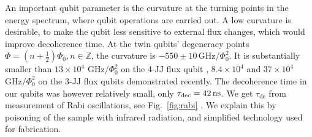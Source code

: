  An  important  qubit parameter  is  the  curvature at  the
 turning  points  in  the   energy  spectrum,  where  qubit
 operations are carried out.  A low curvature is desirable,
 to make the qubit less sensitive to external flux changes,
 which would improve decoherence time.  At the twin qubits'
 degeneracy                                          points
 $ \Phi = (n +  \frac{1}{2})\Phi_0, n\in\mathbb{Z} $, the curvature
 is $  -550\pm10\,\text{GHz}/\Phi_0^2 $.  It  is substantially
 smaller than $  13\times 10^4$ $ \text{GHz}/\Phi_0^2$  on the 4-JJ
 flux qubit \cite{stern2014}, $  8.4 \times 10^4$ \cite{zhu2010}
 and     $     37\times      10^{4}$     $     \text{GHz}/\Phi_0^2$
 \cite{gustavsson2012} on the 3-JJ flux qubits demonstrated
 recently.  The decoherence time  in our qubits was however
 relatively                   small,                   only
 $    \tau_\text{dec}   =    42\,\text{ns}    $.    We    get
 $\tau_\text{dc}$ from  measurement of Rabi  oscillations, see
 Fig.~\ref{fig:rabi}  \cite{rabi}.   We   explain  this  by
 poisoning  of  the  sample with  infrared  radiation,  and
 simplified technology used for fabrication.


